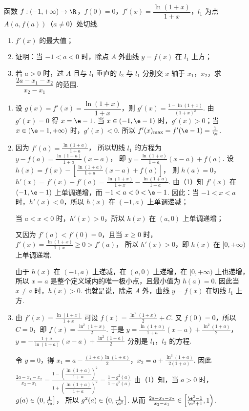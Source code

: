 \begin{problem}
函数 \(f:(-1,+\infty)\to\R\)，\(f(0)=0\)，\(f'(x)=\dfrac{\ln(1+x)}{1+x}\)，\(l_1\) 为点 \(A(a,f(a))\)（\(a\ne0\)）处切线.

\begin{enumerate}
    \item \(f'(x)\) 的最大值；
    \item 证明：当 \(-1<a<0\) 时，除点 \(A\) 外曲线 \(y=f(x)\) 在 \(l_1\) 上方；
    \item 若 \(a>0\) 时，过 \(A\) 且与 \(l_1\) 垂直的 \(l_2\) 与 \(l_1\) 分别交 \(x\) 轴于 \(x_1\)，\(x_2\)，求 \(\dfrac{2a-x_1-x_2}{x_2-x_1}\) 的范围.
\end{enumerate}
\end{problem}

\begin{solution}
\begin{enumerate}
\item 设 \(g(x)=f'(x)=\dfrac{\ln(1+x)}{1+x}\)，则
\(g'(x)=\frac{1-\ln(1+x)}{(1+x)^2}\).
由 \(g'(x)=0\) 得 \(x=\e-1\). 当 \(x\in(-1,\e-1)\) 时，\(g'(x)>0\)；当 \(x\in(\e-1,+\infty)\) 时，\(g'(x)<0\). 所以
\(f'(x)_{\max}=f'(\e-1)=\frac{1}{\e}\).

\item 因为
\(f'(a)=\frac{\ln(1+a)}{1+a}\)，
所以切线 \(l_1\) 的方程为
\(y-f(a)=\frac{\ln(1+a)}{1+a}(x-a)\)，
即
\(y=\frac{\ln(1+a)}{1+a}(x-a)+f(a)\).
设
\(h(x)=f(x)-\left[\frac{\ln(1+a)}{1+a}(x-a)+f(a)\right]\)，
则
\(h(a)=0\)，\(h'(x)=f'(x)-f'(a)=\frac{\ln(1+x)}{1+x}-\frac{\ln(1+a)}{1+a}\).
由（1）知 \(f'(x)\) 在 \((-1,\e-1)\) 上单调递增，而 \(-1<a<0<\e-1\). 因此：当 \(-1<x<a\) 时，\(h'(x)<0\)，所以 \(h(x)\) 在 \((-1,a)\) 上单调递减；

当 \(a<x<0\) 时，\(h'(x)>0\)，所以 \(h(x)\) 在 \((a,0)\) 上单调递增；

又因为 \(f'(a)<f'(0)=0\)，且当 \(x\ge 0\) 时，
\(f'(x)=\frac{\ln(1+x)}{1+x}\ge 0>f'(a)\)，
所以 \(h'(x)>0\)，即 \(h(x)\) 在 \([0,+\infty)\) 上单调递增.

由于 \(h(x)\) 在 \((-1,a)\) 上递减，在 \((a,0)\) 上递增，在 \([0,+\infty)\) 上也递增，所以 \(x=a\) 是整个定义域内的唯一极小点，且最小值为 \(h(a)=0\).
因此当 \(x\ne a\) 时，\(h(x)>0\). 也就是说，除点 \(A\) 外，曲线 \(y=f(x)\) 在切线 \(l_1\) 上方.

\item 由
\(f'(x)=\frac{\ln(1+x)}{1+x}\)
可设
\(f(x)=\frac{\ln^2(1+x)}{2}+C\).
又 \(f(0)=0\)，所以 \(C=0\)，即
\(f(x)=\frac{\ln^2(1+x)}{2}\).
于是
\(y=\frac{\ln(1+a)}{1+a}(x-a)+\frac{\ln^2(1+a)}{2}\)，
\(y=-\frac{1+a}{\ln(1+a)}(x-a)+\frac{\ln^2(1+a)}{2}\)
分别是 \(l_1\)，\(l_2\) 的方程.

令 \(y=0\)，得
\(x_1=a-\frac{(1+a)\ln(1+a)}{2}\)，\(x_2=a+\frac{\ln^3(1+a)}{2(1+a)}\).
因此
\(
\frac{2a-x_1-x_2}{x_2-x_1}
=\frac{1-\left(\dfrac{\ln(1+a)}{1+a}\right)^2}{1+\left(\dfrac{\ln(1+a)}{1+a}\right)^2}
=\frac{1-g^2(a)}{1+g^2(a)}
\)
由（1）知，当 \(a>0\) 时，
\(g(a)\in\left(0,\frac{1}{\e}\right]\)，
所以
\(g^2(a)\in\left(0,\frac{1}{\e^2}\right]\).
从而 \(\frac{2a-x_1-x_2}{x_2-x_1}\in\left[\frac{\e^2-1}{\e^2+1},1\right)\).
\end{enumerate}
\end{solution}

